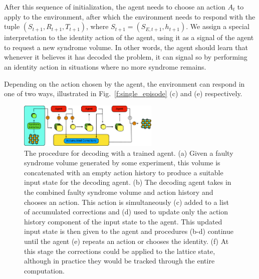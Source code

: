 \documentclass[twocolumn,preprintnumbers,amsmath,amssymb,notitlepage,nofootinbib,longbibliography,superscriptaddress,aps,pra,10pt]{revtex4-1}
\begin{document}

	After this sequence of initialization, the agent needs to choose an action $A_t$ to apply to the environment, after which the environment needs
	to respond with the tuple $(S_{t+1}, R_{t+1}, T_{t+1})$, where $S_{t+1}=(S_{E,{t+1}},h_{t+1})$. We assign a special interpretation to the identity action of the agent,
	using it as a signal of the agent to request a new syndrome volume. In other words, the agent should learn that whenever it believes it has decoded the problem, it can
	signal so by performing an identity action in situations where no more syndrome remains.

	Depending on the action chosen by the agent, the environment can respond in one of two ways, illustrated in Fig.~\ref{f:single_episode} (c) and (e) respectively.

	\begin{figure}
		\centering
		\includegraphics[width=0.6\textwidth]{figures/agent_decoding.pdf}
		\caption{
			The procedure for decoding with a trained agent.
			(a) Given a faulty syndrome volume generated by some experiment, this volume is concatenated with an empty action history to produce a suitable input state for the decoding agent.
			(b) The decoding agent takes in the combined faulty syndrome volume and action history and chooses an action.
			This action is simultaneously (c) added to a list of accumulated corrections and (d) used to update only the action history component of the input state to the agent.
			This updated input state is then given to the agent and procedures (b-d) continue until the agent (e) repeats an action or chooses the identity.
			(f) At this stage the corrections could be applied to the lattice state, although in practice they would be tracked through the entire computation.
		}
		\label{agent_decoding}
	\end{figure}
\end{document}
